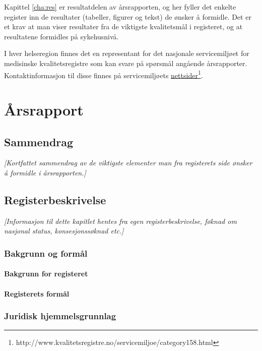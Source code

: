 \documentclass[norsk, a4paper, twocolumn]{report}
\newcommand{\guide}[1] {
	\textit{[\textcolor{guidegray}{#1}]}
	}
\begin{document}
Kapittel \ref{cha:res} er resultatdelen av årsrapporten, og her fyller det
enkelte
register inn de resultater (tabeller, figurer og tekst) de ønsker å formidle.
Det er et krav at man viser resultater fra de viktigste kvalitetsmål i
registeret, og at resultatene formidles på sykehusnivå.

I hver helseregion finnes det en representant for det nasjonale servicemiljøet
for medisinske kvalitetsregistre som kan svare på spørsmål angående
årsrapporter. Kontaktinformasjon til disse finnes på
servicemiljøets \href{http://www.kvalitetsregistre.no/servicemiljoe/category158.html}{nettsider}\footnote{http://www.kvalitetsregistre.no/servicemiljoe/category158.html}.



\tableofcontents
\part{Årsrapport}\label{par:rap}

\twocolumn

\chapter{Sammendrag}
\guide{Kortfattet sammendrag av de viktigste elementer man fra registerets side ønsker å formidle i årsrapporten.}


\chapter{Registerbeskrivelse}\label{cha:reg}
\guide{Informasjon til dette kapitlet hentes fra egen registerbeskrivelse,
føknad om nasjonal status, konsesjonssøknad etc.}


\section{Bakgrunn og formål}
\subsection{Bakgrunn for registeret}\label{sec:bak}
\subsection{Registerets formål}\label{sec:for}

\section{Juridisk hjemmelsgrunnlag}\label{cha:jur}
\end{document}
